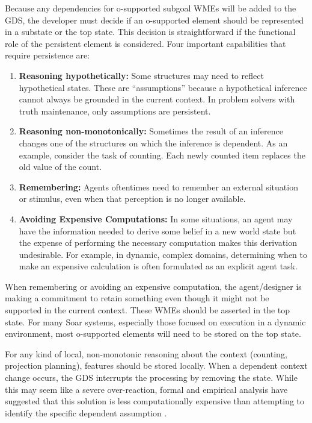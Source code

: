 Because any dependencies for o-supported subgoal WMEs will be added to the GDS, the developer must decide if an o-supported element should be represented in a substate or the top state.
This decision is straightforward if the functional role of the persistent element is considered. Four important capabilities that require persistence are: 

\vspace{-8pt}
\begin{enumerate}
	\item \textbf{Reasoning hypothetically:} 
		Some structures may need to	reflect hypothetical states. These are ``assumptions'' because a hypothetical inference cannot always be grounded in the current context. In problem solvers with truth maintenance, only assumptions are persistent.
	\vspace{-8pt}
	\item \textbf{Reasoning non-monotonically:} 
		Sometimes the result of an inference changes one of the structures on which the inference is dependent. As an example, consider the task of counting. Each newly counted item replaces the old value of the count. 
	\vspace{-8pt}
	\item \textbf{Remembering:} 
		Agents oftentimes need to remember an external situation or stimulus, even when that perception is no longer available.
	\vspace{-8pt}
	\item \textbf{Avoiding Expensive Computations:} 
		In some situations, an agent may have the information needed to derive some belief in a new world state but the expense of performing the necessary computation makes this derivation undesirable. For example, in dynamic, complex domains, determining when to make an expensive calculation is often formulated as an explicit agent task\cite{Jones99:Automated}.
\end{enumerate}

When remembering or avoiding an expensive computation, the agent/designer is making a commitment to retain something even though it might not be supported in the current context. These WMEs should be asserted in the top state. For many Soar systems, especially those focused on execution in a dynamic environment, most o-supported elements will need to be stored on the top state. 

For any kind of local, non-monotonic reasoning about the context (counting, projection planning), features should be stored locally. When a dependent context change occurs, the GDS interrupts the processing by removing the state. While this may seem like a severe over-reaction, formal and empirical analysis have suggested that this solution is less computationally expensive than attempting to identify the specific dependent assumption \cite{Wray03:Ensuring}.


